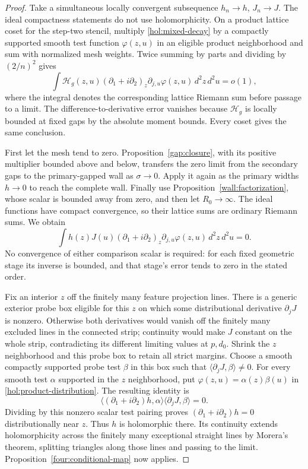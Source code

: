 \begin{proof}
Take a simultaneous locally convergent subsequence $h_n\to h$,
$J_n\to J$.  The ideal compactness statements do not use holomorphicity.
On a product lattice coset for the step-two stencil, multiply
\eqref{hol:mixed-decay} by a compactly supported smooth test function
$\varphi(z,u)$ in an eligible product neighborhood and sum with
normalized mesh weights.  Twice summing by parts and dividing by
$(2/n)^2$ gives
\begin{equation}
 \int \mathcal H_g(z,u)
       (\partial_1+i\partial_2)_z\partial_{j,u}\varphi(z,u)
       \,d^2z\,d^2u=o(1),
 \label{hol:gapped-distribution}
\end{equation}
where the integral denotes the corresponding lattice Riemann sum
before passage to a limit.  The difference-to-derivative error vanishes
because $\mathcal H_g$ is locally bounded at fixed gaps by the absolute
moment bounds.  Every coset gives the same conclusion.

First let the mesh tend to zero.  Proposition~\ref{gap:closure}, with
its positive multiplier bounded above and below, transfers the zero
limit from the secondary gaps to the primary-gapped wall as
$\sigma\to0$.  Apply it again as the primary widths $h\to0$ to reach
the complete wall.  Finally use Proposition~\ref{wall:factorization},
whose scalar is bounded away from zero, and then let $R_0\to\infty$.
The ideal functions have compact convergence, so their lattice sums
are ordinary Riemann sums.  We obtain
\begin{equation}
 \int h(z)J(u)(\partial_1+i\partial_2)_z
             \partial_{j,u}\varphi(z,u)\,d^2z\,d^2u=0.
 \label{hol:product-distribution}
\end{equation}
No convergence of either comparison scalar is required: for each fixed
geometric stage its inverse is bounded, and that stage's error tends
to zero in the stated order.

Fix an interior $z$ off the finitely many feature projection lines.
There is a generic exterior probe box eligible for this $z$ on which
some distributional derivative $\partial_jJ$ is nonzero.  Otherwise
both derivatives would vanish off the finitely many excluded lines
in the connected strip; continuity would make $J$ constant on the
whole strip, contradicting its different limiting values at $p,d_0$.
Shrink the $z$ neighborhood and this probe box to retain all strict
margins.  Choose a smooth compactly supported probe test $\beta$ in
this box such that $\langle\partial_jJ,\beta\rangle\ne0$.
For every smooth test $\alpha$ supported in the $z$ neighborhood,
put $\varphi(z,u)=\alpha(z)\beta(u)$ in
\eqref{hol:product-distribution}.  The resulting identity is
\[
 \bigl\langle(\partial_1+i\partial_2)h,\alpha\bigr\rangle
 \bigl\langle\partial_jJ,\beta\bigr\rangle=0.
\]
Dividing by this nonzero scalar test pairing proves
$(\partial_1+i\partial_2)h=0$ distributionally near $z$.
Thus $h$ is holomorphic there.  Its continuity extends holomorphicity
across the finitely many exceptional straight lines by Morera's
theorem, splitting triangles along those lines and passing to the
limit.  Proposition~\ref{four:conditional-map} now applies.
\end{proof}
